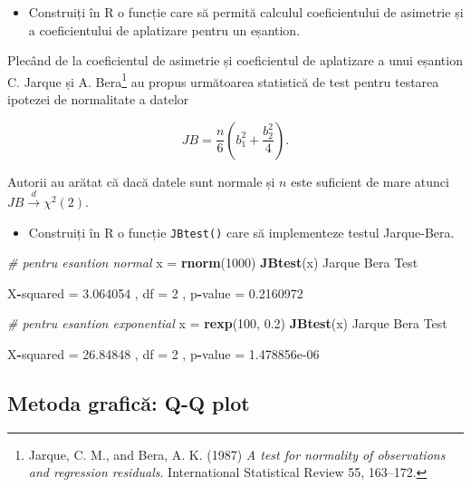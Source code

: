\documentclass[]{article}
\newenvironment{Shaded}{\begin{snugshade}}{\end{snugshade}}
\newcommand{\KeywordTok}[1]{\textcolor[rgb]{0.13,0.29,0.53}{\textbf{#1}}}
\newcommand{\DecValTok}[1]{\textcolor[rgb]{0.00,0.00,0.81}{#1}}
\newcommand{\FloatTok}[1]{\textcolor[rgb]{0.00,0.00,0.81}{#1}}
\newcommand{\StringTok}[1]{\textcolor[rgb]{0.31,0.60,0.02}{#1}}
\newcommand{\CommentTok}[1]{\textcolor[rgb]{0.56,0.35,0.01}{\textit{#1}}}
\newcommand{\OperatorTok}[1]{\textcolor[rgb]{0.81,0.36,0.00}{\textbf{#1}}}
\newcommand{\NormalTok}[1]{#1}
\let\rmarkdownfootnote\footnote%
\def\footnote{\protect\rmarkdownfootnote}
\newenvironment{frshaded*}{%
  \def\FrameCommand{\fboxrule=\FrameRule\fboxsep=\FrameSep \fcolorbox{framecolor}{shadecolor1}}%
  \MakeFramed {\advance\hsize-\width \FrameRestore}}%
{\endMakeFramed}
\newenvironment{rmdblock}[1]
  {\begin{frshaded*}
  \begin{itemize}
  \renewcommand{\labelitemi}{
    \raisebox{-.7\height}[0pt][0pt]{
      {\setkeys{Gin}{width=2em,keepaspectratio}\texttt{[image: images/icons/\#1]}}
    }
  }
  \item
  }
  {
  \end{itemize}
  \end{frshaded*}
  }
\newenvironment{rmdexercise}
  {\begin{rmdblock}{exercise}}
  {\end{rmdblock}}
\begin{document}
\begin{rmdexercise}
Construiți în R o funcție care să permită calculul coeficientului de
asimetrie și a coeficientului de aplatizare pentru un eșantion.
\end{rmdexercise}

Plecând de la coeficientul de asimetrie și coeficientul de aplatizare a
unui eșantion C. Jarque și A. Bera\footnote{Jarque, C. M., and Bera, A.
  K. (1987) \emph{A test for normality of observations and regression
  residuals}. International Statistical Review 55, 163--172.} au propus
următoarea statistică de test pentru testarea ipotezei de normalitate a
datelor

\[
  JB = \frac{n}{6}\left(b_1^2 + \frac{b_2^2}{4}\right).
\]

Autorii au arătat că dacă datele sunt normale și \(n\) este suficient de
mare atunci \(JB\overset{d}{\to}\chi^2(2)\).

\begin{rmdexercise}
Construiți în R o funcție \texttt{JBtest()} care să implementeze testul
Jarque-Bera.
\end{rmdexercise}

\begin{Shaded}
\begin{Highlighting}[]
\CommentTok{# pentru esantion normal }
\NormalTok{x =}\StringTok{ }\KeywordTok{rnorm}\NormalTok{(}\DecValTok{1000}\NormalTok{)}
\KeywordTok{JBtest}\NormalTok{(x)}
\NormalTok{Jarque Bera Test}

\NormalTok{X}\OperatorTok{-}\NormalTok{squared =}\StringTok{  }\FloatTok{3.064054}\NormalTok{ , df =}\StringTok{  }\DecValTok{2}\NormalTok{ , p}\OperatorTok{-}\NormalTok{value =}\StringTok{  }\FloatTok{0.2160972} 

\CommentTok{# pentru esantion exponential  }
\NormalTok{x =}\StringTok{ }\KeywordTok{rexp}\NormalTok{(}\DecValTok{100}\NormalTok{, }\FloatTok{0.2}\NormalTok{)}
\KeywordTok{JBtest}\NormalTok{(x)}
\NormalTok{Jarque Bera Test}

\NormalTok{X}\OperatorTok{-}\NormalTok{squared =}\StringTok{  }\FloatTok{26.84848}\NormalTok{ , df =}\StringTok{  }\DecValTok{2}\NormalTok{ , p}\OperatorTok{-}\NormalTok{value =}\StringTok{  }\FloatTok{1.478856e-06} 
\end{Highlighting}
\end{Shaded}

\subsection{Metoda grafică: Q-Q plot}\label{metoda-grafica-q-q-plot}
\end{document}

